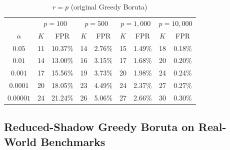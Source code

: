 \documentclass[runningheads]{llncs}
\begin{document}
\begin{table}[H]
\begin{subtable}{\textwidth}
\centering
\caption{$r = p$ (original Greedy Boruta)}
\begin{tabular}{c|cc|cc|cc|cc}
\toprule
& \multicolumn{2}{c|}{$p = 100$}
& \multicolumn{2}{c|}{$p = 500$}
& \multicolumn{2}{c|}{$p = 1{,}000$}
& \multicolumn{2}{c}{$p = 10{,}000$} \\
$\alpha$
& $K$ & FPR
& $K$ & FPR
& $K$ & FPR
& $K$ & FPR \\
\midrule
$0.05$    & 11 & 10.37\% & 14 & 2.76\% & 15 & 1.49\% & 18 & 0.18\% \\
$0.01$    & 14 & 13.00\% & 16 & 3.15\% & 17 & 1.68\% & 20 & 0.20\% \\
$0.001$   & 17 & 15.56\% & 19 & 3.73\% & 20 & 1.98\% & 24 & 0.24\% \\
$0.0001$  & 20 & 18.05\% & 23 & 4.49\% & 24 & 2.37\% & 27 & 0.27\% \\
$0.00001$ & 24 & 21.24\% & 26 & 5.06\% & 27 & 2.66\% & 30 & 0.30\% \\
\bottomrule
\end{tabular}
\end{subtable}

\end{table}

\subsection{Reduced-Shadow Greedy Boruta on Real-World Benchmarks}
\end{document}
